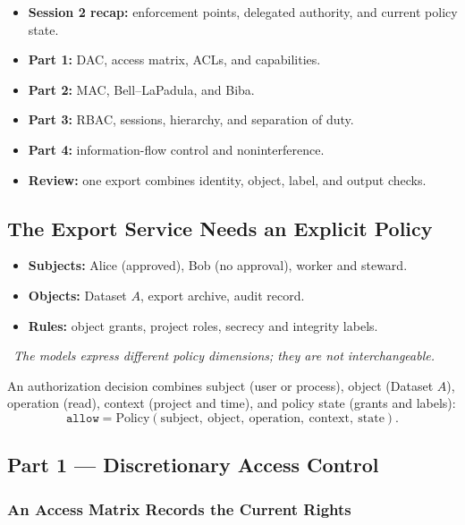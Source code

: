 \documentclass[hidelinks]{article}
\newcommand{\callout}[1]{\par\smallskip\noindent{\color{capri}$\blacktriangleright$}\ \textit{#1}\par\smallskip}
\begin{document}
\begin{itemize}
    \item \textbf{Session 2 recap:} enforcement points, delegated authority, and current policy state.
    \item \textbf{Part 1:} DAC, access matrix, ACLs, and capabilities.
    \item \textbf{Part 2:} MAC, Bell--LaPadula, and Biba.
    \item \textbf{Part 3:} RBAC, sessions, hierarchy, and separation of duty.
    \item \textbf{Part 4:} information-flow control and noninterference.
    \item \textbf{Review:} one export combines identity, object, label, and output checks.
\end{itemize}

\subsection{The Export Service Needs an Explicit Policy}

\begin{itemize}
    \item \textbf{Subjects:} Alice (approved), Bob (no approval), worker and steward.
    \item \textbf{Objects:} Dataset $A$, export archive, audit record.
    \item \textbf{Rules:} object grants, project roles, secrecy and integrity labels.
\end{itemize}

\callout{The models express different policy dimensions; they are not interchangeable.}

An authorization decision combines subject (user or process), object (Dataset $A$), operation (read), context (project and time), and policy state (grants and labels):
\[
\texttt{allow} = \mathrm{Policy}(\text{subject},\ \text{object},\ \text{operation},\ \text{context},\ \text{state}).
\]

\subsection{Part 1 --- Discretionary Access Control}

\subsubsection{An Access Matrix Records the Current Rights}
\end{document}
